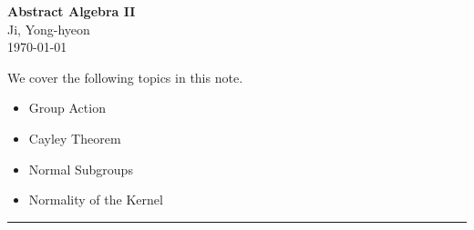 \documentclass[11pt,openany]{article}
\begin{document}
\begin{center}
	\huge\textbf{Abstract Algebra II}\\
	\vspace{0.5em}
	\large{Ji, Yong-hyeon}\\
	\vspace{0.5em}
	\normalsize{\today}\\
\end{center}

\noindent 
We cover the following topics in this note.
\begin{itemize}
	\item Group Action
	\item Cayley Theorem
	\item Normal Subgroups
	\item Normality of the Kernel
\end{itemize}
\hrule\vspace{12pt}
\vfill
\end{document}
